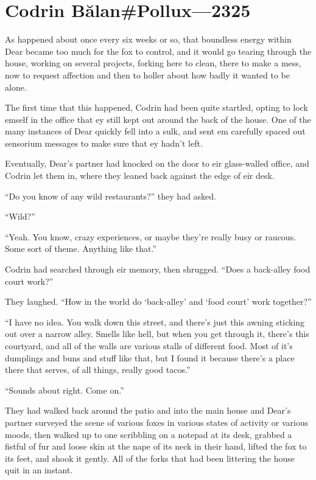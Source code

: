 \hypertarget{codrin-bux103lanpollux-2325}{%
\chapter{Codrin Bălan\#Pollux---2325}\label{codrin-bux103lanpollux-2325}}

As happened about once every six weeks or so, that boundless energy within Dear became too much for the fox to control, and it would go tearing through the house, working on several projects, forking here to clean, there to make a mess, now to request affection and then to holler about how badly it wanted to be alone.

The first time that this happened, Codrin had been quite startled, opting to lock emself in the office that ey still kept out around the back of the house. One of the many instances of Dear quickly fell into a sulk, and sent em carefully spaced out sensorium messages to make sure that ey hadn't left.

Eventually, Dear's partner had knocked on the door to eir glass-walled office, and Codrin let them in, where they leaned back against the edge of eir desk.

``Do you know of any wild restaurants?'' they had asked.

``Wild?''

``Yeah. You know, crazy experiences, or maybe they're really busy or raucous. Some sort of theme. Anything like that.''

Codrin had searched through eir memory, then shrugged. ``Does a back-alley food court work?''

They laughed. ``How in the world do `back-alley' and `food court' work together?''

``I have no idea. You walk down this street, and there's just this awning sticking out over a narrow alley. Smells like hell, but when you get through it, there's this courtyard, and all of the walls are various stalls of different food. Most of it's dumplings and buns and stuff like that, but I found it because there's a place there that serves, of all things, really good tacos.''

``Sounds about right. Come on.''

They had walked back around the patio and into the main house and Dear's partner surveyed the scene of various foxes in various states of activity or various moods, then walked up to one scribbling on a notepad at its desk, grabbed a fistful of fur and loose skin at the nape of its neck in their hand, lifted the fox to its feet, and shook it gently. All of the forks that had been littering the house quit in an instant.

